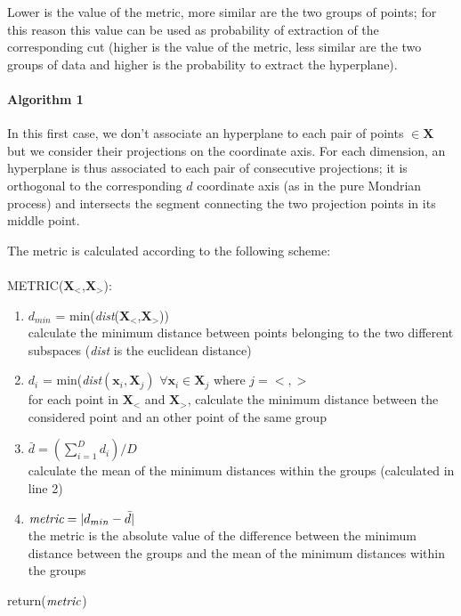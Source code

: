 \documentclass[a4paper]{article}
\begin{document}
Lower is the value of the metric, more similar are the two groups of points;
for this reason this value can be used as probability of extraction of the corresponding cut (higher is the value of the metric, less similar are the two groups of data and higher is the probability to extract the hyperplane).





\paragraph{Algorithm 1}

In this first case, we don't associate an hyperplane to each pair of points $\in \pmb{X}$  but we consider their projections on the coordinate axis.
For each dimension, an hyperplane is thus associated to each pair of consecutive projections;
it is orthogonal to the corresponding $d$ coordinate axis (as in the pure Mondrian process) and intersects the segment connecting the two projection points in its middle point.






The metric is calculated according to the following scheme:\\ \\
METRIC($\pmb{X}_<$,$\pmb{X}_>$):
\begin{enumerate}[nolistsep]
\item $d_{min}$ = min(\emph{dist}($\pmb{X}_<$,$\pmb{X}_>$))\\
calculate the minimum distance between points belonging to the two different subspaces (\emph{dist} is the euclidean distance)
\item $d_i$ = min(\emph{dist}$(\pmb{x}_i,\pmb{X}_j)$ $\forall \pmb{x}_i \in \pmb{X}_j$ where $j=<,>$ \\
for each point in $\pmb{X}_<$ and $\pmb{X}_>$, calculate the minimum distance between the considered point and an other point of the same group
\item $\bar{d} = (\sum_{i=1}^D d_i)/D$ \\
 calculate the mean of the minimum distances within the groups (calculated in line 2)
\item $\emph{metric} = \lvert d_{min} - \bar{d} \lvert$\\
the metric is the absolute value of the difference between the minimum distance between the groups and the mean of the minimum distances within the groups
\end{enumerate}
return($\emph{metric}$)\\ \\
\end{document}
